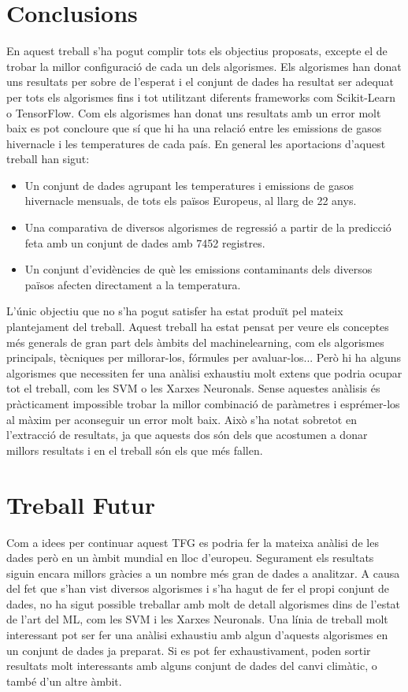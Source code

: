 \documentclass[10pt,a4paper,twocolumn,twoside]{article}
\begin{document}
\section {Conclusions}
En aquest treball s'ha pogut complir tots els objectius proposats, excepte el de trobar la millor configuració de cada un dels algorismes. Els algorismes han donat uns resultats per sobre de l'esperat i el conjunt de dades ha resultat ser adequat per tots els algorismes fins i tot utilitzant diferents frameworks com Scikit-Learn o TensorFlow. Com els algorismes han donat uns resultats amb un error molt baix es pot concloure que sí que hi ha una relació entre les emissions de gasos hivernacle i les temperatures de cada país. En general les aportacions d'aquest treball han sigut:
\begin{itemize}
\item Un conjunt de dades agrupant les temperatures i emissions de gasos hivernacle mensuals, de tots els països Europeus, al llarg de 22 anys.
\item Una comparativa de diversos algorismes de regressió a partir de la predicció feta amb un conjunt de dades amb 7452 registres.
\item Un conjunt d'evidències de què les emissions contaminants dels diversos països afecten directament a la temperatura.
\end{itemize}
L'únic objectiu que no s'ha pogut satisfer ha estat produït pel mateix plantejament del treball. Aquest treball ha estat pensat per veure els conceptes més generals de gran part dels àmbits del machinelearning, com els algorismes principals, tècniques per millorar-los, fórmules per avaluar-los... Però hi ha alguns algorismes que necessiten fer una anàlisi exhaustiu molt extens que podria ocupar tot el treball, com les SVM o les Xarxes Neuronals. Sense aquestes anàlisis és pràcticament impossible trobar la millor combinació de paràmetres i esprémer-los al màxim per aconseguir un error molt baix. Això s'ha notat sobretot en l'extracció de resultats, ja que aquests dos són dels que acostumen a donar millors resultats i en el treball són els que més fallen.

\section{Treball Futur}
Com a idees per continuar aquest TFG es podria fer la mateixa anàlisi de les dades però en un àmbit mundial en lloc d'europeu. Segurament els resultats siguin encara millors gràcies a un nombre més gran de dades a analitzar. A causa del fet que s'han vist diversos algorismes i s'ha hagut de fer el propi conjunt de dades, no ha sigut possible treballar amb molt de detall algorismes dins de l'estat de l'art del ML, com les SVM i les Xarxes Neuronals. Una línia de treball molt interessant pot ser fer una anàlisi exhaustiu amb algun d'aquests algorismes en un conjunt de dades ja preparat. Si es pot fer exhaustivament, poden sortir resultats molt interessants amb alguns conjunt de dades del canvi climàtic, o també d'un altre àmbit.
\end{document}
